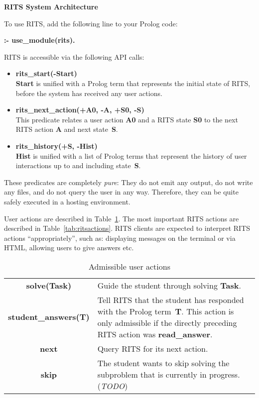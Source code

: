 \documentclass[a4paper,11pt]{article}
\begin{document}
\noindent
\begin{center}
\Large\textbf{RITS System Architecture}
\end{center}

\vspace{1cm}
\noindent
To use RITS, add the following line to your Prolog code:

\bigskip
\textbf{:- use\_module(rits).}
\bigskip

\noindent RITS is accessible via the following API calls:

\begin{itemize}
\item \textbf{rits\_start(-Start)}\\\textbf{Start} is unified with a
  Prolog term that represents the initial state of RITS, before the
  system has received any user actions.

\item \textbf{rits\_next\_action(+A0, -A, +S0, -S)}\\
  This predicate relates a user action \textbf{A0} and a RITS state
  \textbf{S0} to the next RITS action \textbf{A} and next
  state~\textbf{S}.

\item \textbf{rits\_history(+S, -Hist)}\\
  \textbf{Hist} is unified with a list of Prolog terms that represent
  the history of user interactions up to and including state~\textbf{S}.
\end{itemize}

These predicates are completely \textit{pure}: They do not emit any
output, do not write any files, and do not query the user in any way.
Therefore, they can be quite safely executed in a hosting environment.

User actions are described in Table~\ref{tab:useractions}. The most
important RITS actions are described in Table~\ref{tab:ritsactions}.
RITS clients are expected to interpret RITS actions ``appropriately'',
such as: displaying messages on the terminal or via HTML, allowing
users to give answers etc.

\begin{table}[ht]
  \centering
  \begin{tabular}{cp{7cm}}
    \hline
    \textbf{solve(Task)} & Guide the student through solving \textbf{Task}.\\
    \textbf{student\_answers(T)} & Tell RITS that the student has responded with the Prolog term~\textbf{T}. This action is only admissible if the directly preceding RITS action was \textbf{read\_answer}.\\
    \textbf{next} & Query RITS for its next action. \\
    \textbf{skip} & The student wants to skip solving the subproblem that is
    currently in progress. (\textit{TODO})\\
    \hline
  \end{tabular}
\caption{Admissible user actions}
  \label{tab:useractions}
\end{table}
\end{document}
